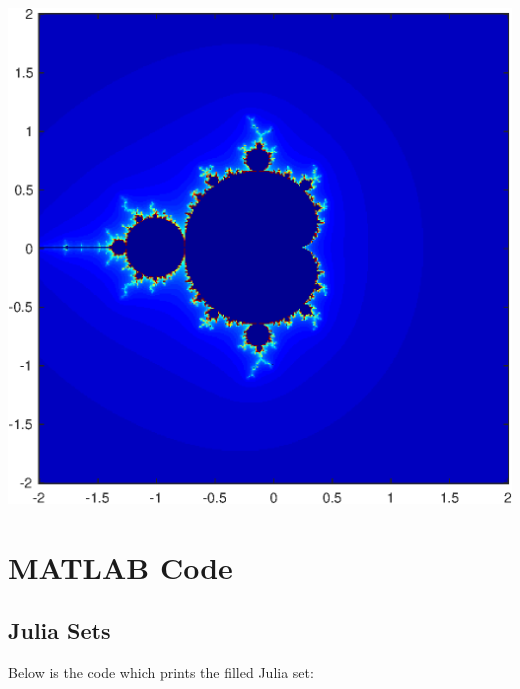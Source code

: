 \documentclass[12pt]{article}
\begin{document}
 \begin{center} \includegraphics [width=0.5\linewidth]{Mandelbrot_01.eps} \end{center}
 
 




\section{MATLAB Code} \label{code}
	\subsection{Julia Sets} \label{JS}
\noindent	Below is the code which prints the filled Julia set:\\
	
\end{document}
